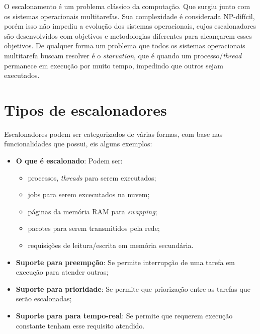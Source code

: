 O escalonamento é um problema clássico da computação. Que surgiu junto com os sistemas operacionais multitarefas. Sua complexidade é considerada NP-difícil, porém isso não impediu a evolução dos sistemas operacionais, cujos escalonadores são desenvolvidos com objetivos e metodologias diferentes para alcançarem esses objetivos. De qualquer forma um problema que todos os sistemas operacionais multitarefa buscam resolver é o \textit{starvation}, que é quando um processo/\textit{thread} permanece em execução por muito tempo, impedindo que outros sejam executados.

\section{Tipos de escalonadores}

Escalonadores podem ser categorizados de várias formas, com base nas funcionalidades que possui, eis alguns exemplos:

\begin{itemize}
	\item \textbf{O que é escalonado}: Podem ser:
	\begin{itemize}
		\item processos, \textit{threads} para serem executados;
		\item jobs para serem excecutados na nuvem;
		\item páginas da memória RAM para \textit{swapping};
		\item pacotes para serem transmitidos pela rede;
		\item requisições de leitura/escrita em memória secundária.
	\end{itemize}
	\item \textbf{Suporte para preempção}: Se permite interrupção de uma tarefa em execução para atender outras;
	\item \textbf{Suporte para prioridade}: Se permite que priorização entre as tarefas que serão escalonadas;
	\item \textbf{Suporte para para tempo-real}: Se permite que requerem execução constante tenham esse requisito atendido.
\end{itemize}


